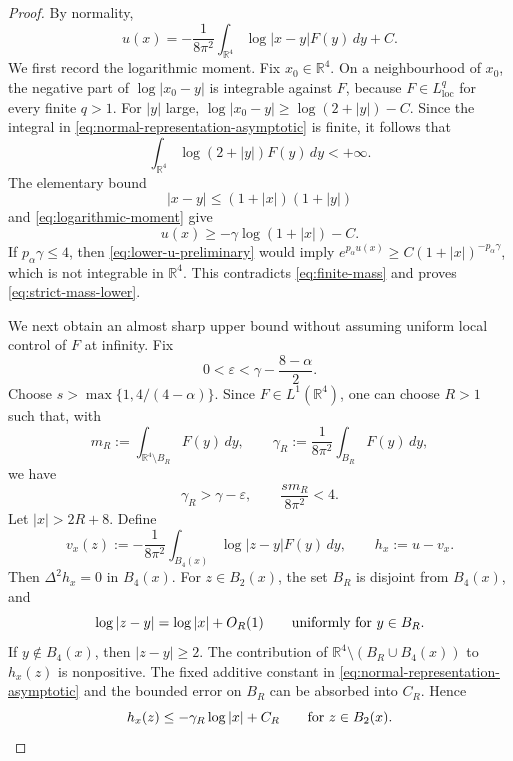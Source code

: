 \documentclass[10pt,a4paper]{amsart}
\begin{document}
\begin{proof}
By normality,
\begin{equation}\label{eq:normal-representation-asymptotic}
u(x)=-\frac{1}{8\pi^{2}}
\int_{\mathbb R^{4}}\log|x-y|F(y)\,dy+C.
\end{equation}
We first record the logarithmic moment. Fix \(x_{0}\in\mathbb R^{4}\). On a neighbourhood of \(x_{0}\), the negative part of \(\log|x_{0}-y|\) is integrable against \(F\), because \(F\in L^{q}_{\operatorname{loc}}\) for every finite \(q>1\). For \(|y|\) large,
\(\log|x_{0}-y|\geq\log(2+|y|)-C\). Since the integral in \eqref{eq:normal-representation-asymptotic} is finite, it follows that
\begin{equation}\label{eq:logarithmic-moment}
\int_{\mathbb R^{4}}\log(2+|y|)F(y)\,dy<+\infty.
\end{equation}
The elementary bound
\[
|x-y|\leq(1+|x|)(1+|y|)
\]
and \eqref{eq:logarithmic-moment} give
\begin{equation}\label{eq:lower-u-preliminary}
u(x)\geq-\gamma\log(1+|x|)-C.
\end{equation}
If \(p_{\alpha}\gamma\leq4\), then \eqref{eq:lower-u-preliminary} would imply
\(e^{p_{\alpha}u(x)}\geq C(1+|x|)^{-p_{\alpha}\gamma}\), which is not integrable in \(\mathbb R^{4}\). This contradicts \eqref{eq:finite-mass} and proves \eqref{eq:strict-mass-lower}.

We next obtain an almost sharp upper bound without assuming uniform local control of \(F\) at infinity. Fix
\begin{equation}\label{eq:epsilon-choice-asymptotic}
0<\varepsilon<\gamma-\frac{8-\alpha}{2}.
\end{equation}
Choose \(s>\max\{1,4/(4-\alpha)\}\). Since \(F\in L^{1}(\mathbb R^{4})\), one can choose \(R>1\) such that, with
\[
m_{R}:=\int_{\mathbb R^{4}\setminus B_{R}}F(y)\,dy,
\qquad
\gamma_{R}:=\frac{1}{8\pi^{2}}\int_{B_{R}}F(y)\,dy,
\]
we have
\begin{equation}\label{eq:tail-small-choice}
\gamma_{R}>\gamma-\varepsilon,
\qquad
\frac{s m_{R}}{8\pi^{2}}<4.
\end{equation}
Let \(|x|>2R+8\). Define
\[
v_{x}(z):=-\frac{1}{8\pi^{2}}
\int_{B_{4}(x)}\log|z-y|F(y)\,dy,
\qquad
h_{x}:=u-v_{x}.
\]
Then \(\Delta^{2}h_{x}=0\) in \(B_{4}(x)\). For \(z\in B_{2}(x)\), the set \(B_{R}\) is disjoint from \(B_{4}(x)\), and
\[
\log|z-y|=\log|x|+O_{R}(1)
\qquad\hbox{uniformly for }y\in B_{R}.
\]
If \(y\notin B_{4}(x)\), then \(|z-y|\geq2\). The contribution of
\(\mathbb R^{4}\setminus(B_{R}\cup B_{4}(x))\) to \(h_x(z)\) is
nonpositive. The fixed additive constant in \eqref{eq:normal-representation-asymptotic}
and the bounded error on \(B_R\) can be absorbed into \(C_R\). Hence
\begin{equation}\label{eq:hx-upper}
h_{x}(z)\leq-\gamma_{R}\log|x|+C_{R}
\qquad\hbox{for }z\in B_{2}(x).
\end{equation}


\end{proof}
\end{document}
